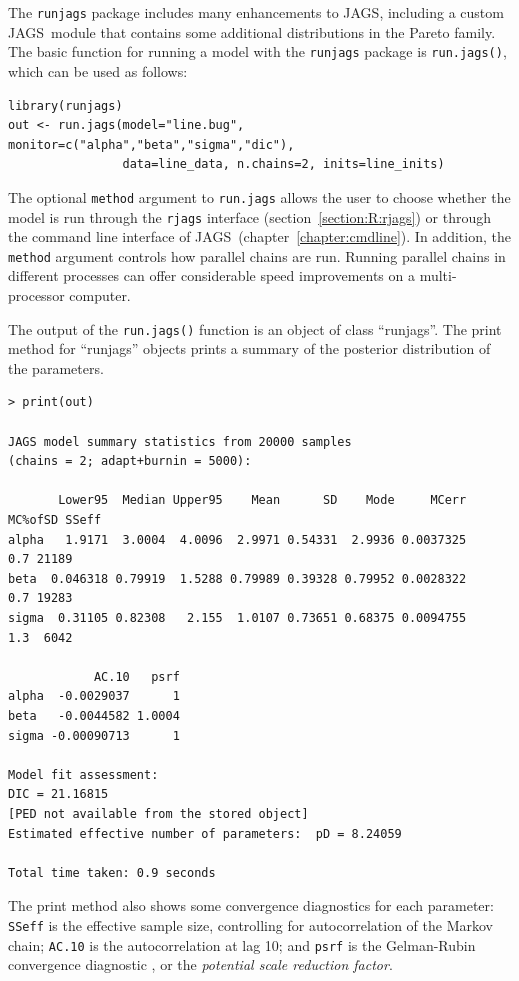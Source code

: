 \documentclass[11pt, a4paper, titlepage]{report}
\newcommand{\JAGS}{\textsf{JAGS}}
\begin{document}
The \texttt{runjags} package \citep{Denwood2016} includes many
enhancements to \JAGS, including a custom \JAGS\ module that contains
some additional distributions in the Pareto family. The basic function for 
running a model with the \texttt{runjags} package is \texttt{run.jags()}, 
which can be used as follows:
\begin{verbatim}
library(runjags)
out <- run.jags(model="line.bug", monitor=c("alpha","beta","sigma","dic"),
                data=line_data, n.chains=2, inits=line_inits)
\end{verbatim}
The optional \texttt{method} argument to \texttt{run.jags} allows the
user to choose whether the model is run through the \texttt{rjags}
interface (section~\ref{section:R:rjags}) or through the command line
interface of \JAGS\ (chapter~\ref{chapter:cmdline}). In addition, the
\texttt{method} argument controls how parallel chains are run. Running
parallel chains in different processes can offer considerable speed
improvements on a multi-processor computer.

The output of the \texttt{run.jags()} function is an object of class
``runjags''. The print method for ``runjags'' objects prints a summary
of the posterior distribution of the parameters.
\begin{verbatim}
> print(out)

JAGS model summary statistics from 20000 samples 
(chains = 2; adapt+burnin = 5000):

       Lower95  Median Upper95    Mean      SD    Mode     MCerr MC%ofSD SSeff
alpha   1.9171  3.0004  4.0096  2.9971 0.54331  2.9936 0.0037325     0.7 21189
beta  0.046318 0.79919  1.5288 0.79989 0.39328 0.79952 0.0028322     0.7 19283
sigma  0.31105 0.82308   2.155  1.0107 0.73651 0.68375 0.0094755     1.3  6042

            AC.10   psrf
alpha  -0.0029037      1
beta   -0.0044582 1.0004
sigma -0.00090713      1

Model fit assessment:
DIC = 21.16815
[PED not available from the stored object]
Estimated effective number of parameters:  pD = 8.24059

Total time taken: 0.9 seconds
\end{verbatim}
The print method also shows some convergence diagnostics for each
parameter: \texttt{SSeff} is the effective sample size, controlling
for autocorrelation of the Markov chain; \texttt{AC.10} is the autocorrelation
at lag 10; and \texttt{psrf} is the Gelman-Rubin convergence diagnostic
\citep{GelmanRubin1992}, or the {\em potential scale reduction factor}.
\end{document}
